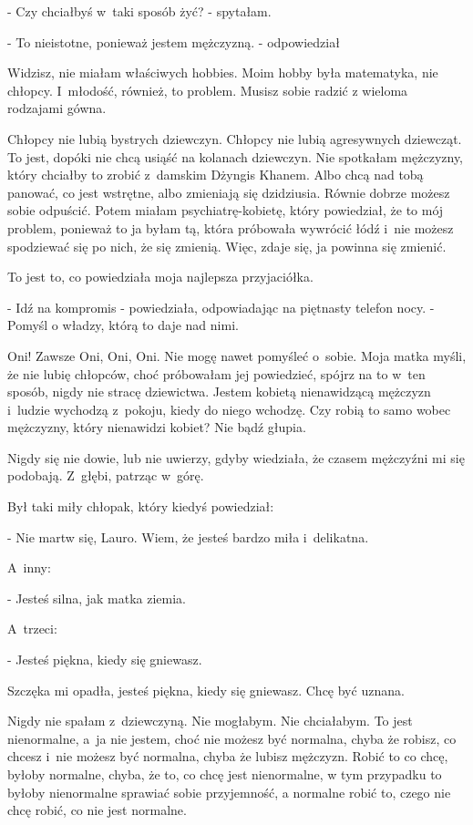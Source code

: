 \documentclass[oneside,polish,12pt,sfheadings]{mwbk}
\begin{document}
- Czy chciałbyś w~taki sposób żyć? - spytałam.

- To nieistotne, ponieważ jestem mężczyzną. - odpowiedział

Widzisz, nie miałam właściwych hobbies. Moim hobby była matematyka,
nie chłopcy. I~młodość, również, to problem. Musisz sobie radzić z
wieloma rodzajami gówna.

Chłopcy nie lubią bystrych dziewczyn. Chłopcy nie lubią agresywnych
dziewcząt. To jest, dopóki nie chcą usiąść na kolanach dziewczyn.
Nie spotkałam mężczyzny, który chciałby to zrobić z~damskim Dżyngis
Khanem. Albo chcą nad tobą panować, co jest wstrętne, albo zmieniają
się dzidziusia. Równie dobrze możesz sobie odpuścić. Potem miałam
psychiatrę-kobietę, który powiedział, że to mój problem, ponieważ
to ja byłam tą, która próbowała wywrócić łódź i~nie możesz spodziewać
się po nich, że się zmienią. Więc, zdaje się, ja powinna się zmienić.

To jest to, co powiedziała moja najlepsza przyjaciółka. 

- Idź na kompromis
- powiedziała, odpowiadając na piętnasty telefon nocy. - Pomyśl o
władzy, którą to daje nad nimi.

Oni! Zawsze Oni, Oni, Oni. Nie mogę nawet pomyśleć o~sobie. Moja matka
myśli, że nie lubię chłopców, choć próbowałam jej powiedzieć, spójrz
na to w~ten sposób, nigdy nie stracę dziewictwa. Jestem kobietą nienawidzącą
mężczyzn i~ludzie wychodzą z~pokoju, kiedy do niego wchodzę. Czy robią
to samo wobec mężczyzny, który nienawidzi kobiet? Nie bądź głupia.

Nigdy się nie dowie, lub nie uwierzy, gdyby wiedziała, że czasem mężczyźni
mi się podobają. Z~głębi, patrząc w~górę.

Był taki miły chłopak, który kiedyś powiedział: 

- Nie martw się, Lauro. Wiem, że jesteś bardzo miła i~delikatna. 

A~inny: 

- Jesteś silna, jak matka ziemia. 

A~trzeci: 

- Jesteś piękna, kiedy się gniewasz.

Szczęka mi opadła, jesteś piękna, kiedy się gniewasz. Chcę być uznana.

Nigdy nie spałam z~dziewczyną. Nie mogłabym. Nie chciałabym. To jest
nienormalne, a~ja nie jestem, choć nie możesz być normalna, chyba
że robisz, co chcesz i~nie możesz być normalna, chyba że lubisz mężczyzn.
Robić to co chcę, byłoby normalne, chyba, że to, co chcę jest nienormalne,
w tym przypadku to byłoby nienormalne sprawiać sobie przyjemność,
a normalne robić to, czego nie chcę robić, co nie jest normalne.
\end{document}
